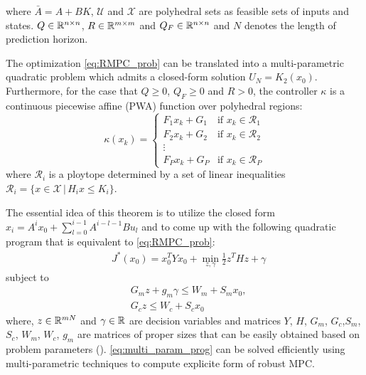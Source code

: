 where $\bar A=A+BK$, $\mathcal U$ and $\mathcal X$ are polyhedral sets as feasible sets of inputs and states. $Q\in\mathbb{R}^{n\times n}$, $R\in\mathbb{R}^{m\times m}$ and $Q_F\in\mathbb{R}^{n\times n}$ and $N$ denotes the length of prediction horizon.
\begin{theorem}
The optimization  \eqref{eq:RMPC_prob} can be translated into a multi-parametric quadratic problem which admits a closed-form solution $U_N=K_2(x_0)$. Furthermore, for the case that $Q\geq0$, $Q_F\geq0$ and $R>0$, the controller $\kappa$ is a continuous piecewise affine (PWA) function over polyhedral regions:
\begin{equation}
\kappa(x_k)=
\begin{cases}
F_1x_k+G_1 & \text{if $x_k\in \mathcal{R}_1$}\\
F_2x_k+G_2 & \text{if $x_k\in \mathcal{R}_2$}\\
\vdots\\
F_Px_k+G_P & \text{if $x_k\in \mathcal{R}_P$}
\end{cases} 
\end{equation}
where $\mathcal{R}_i$ is a ploytope determined by a set of linear inequalities $\mathcal R_i = \{x\in\mathcal X\,|\,H_ix\leq K_i\}$. 
\end{theorem}
The essential idea of this theorem is to utilize the closed form $x_i=A^ix_0+\sum_{l=0}^{i-1}A^{i-l-1}Bu_l$ and to come up with the following quadratic program that is equivalent to \eqref{eq:RMPC_prob}:
\begin{align*}
\label{eq:multi_param_prog}
&J^{\ast}(x_0)=x_0^TYx_0+\min_{z,\gamma}\frac{1}{2}z^THz+\gamma
\end{align*}
subject to
\begin{align*}
&G_mz+g_m\gamma\leq W_m+S_mx_0,\\
&G_cz\leq W_c+S_cx_0
\end{align*} 
where, $z\in \mathbb{R}^{mN}$ and $\gamma\in\mathbb{R}$ are decision variables and matrices $Y$, $H$, $G_m$, $G_c$,$S_m$, $S_c$, $W_m$, $W_c$, $g_m$ are matrices of proper sizes that can be easily obtained based on problem parameters (\cite{delaPea:2005}). \eqref{eq:multi_param_prog} can be solved efficiently using multi-parametric techniques to compute explicite form of robust MPC.

